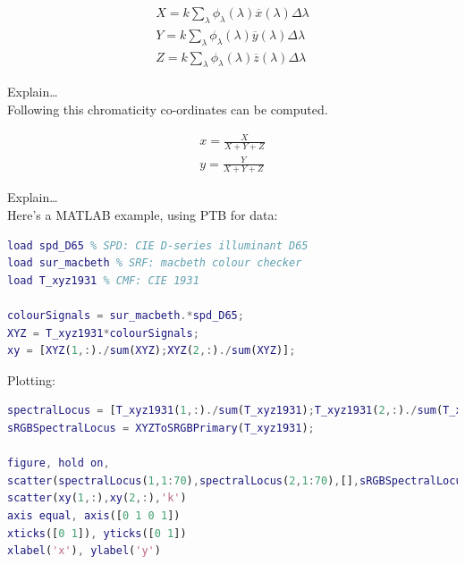 \begin{subequations}
\begin{align}
X=k \sum_{\lambda} \phi_{\lambda}(\lambda) \overline{x}(\lambda) \Delta \lambda \\ 
Y=k \sum_{\lambda} \phi_{\lambda}(\lambda) \overline{y}(\lambda) \Delta \lambda \\ 
Z=k \sum_{\lambda} \phi_{\lambda}(\lambda) \overline{z}(\lambda) \Delta \lambda
\end{align}
\end{subequations}

Explain\dots \\
Following this chromaticity co-ordinates can be computed.

\begin{subequations}
\begin{align}
x=\frac{X}{X+Y+Z} \\
y=\frac{Y}{X+Y+Z} 
\end{align}
\end{subequations}

Explain\dots \\
Here's a \gls{MATLAB} example, using \gls{PTB} for data:

\begin{lstlisting}[language=MATLAB]
load spd_D65 % SPD: CIE D-series illuminant D65
load sur_macbeth % SRF: macbeth colour checker
load T_xyz1931 % CMF: CIE 1931

colourSignals = sur_macbeth.*spd_D65;
XYZ = T_xyz1931*colourSignals;
xy = [XYZ(1,:)./sum(XYZ);XYZ(2,:)./sum(XYZ)];
\end{lstlisting}

Plotting: 

\begin{lstlisting}[language=MATLAB]
spectralLocus = [T_xyz1931(1,:)./sum(T_xyz1931);T_xyz1931(2,:)./sum(T_xyz1931)];
sRGBSpectralLocus = XYZToSRGBPrimary(T_xyz1931);

figure, hold on, 
scatter(spectralLocus(1,1:70),spectralLocus(2,1:70),[],sRGBSpectralLocus(:,1:70)','filled')
scatter(xy(1,:),xy(2,:),'k')
axis equal, axis([0 1 0 1])
xticks([0 1]), yticks([0 1])
xlabel('x'), ylabel('y')
\end{lstlisting}

